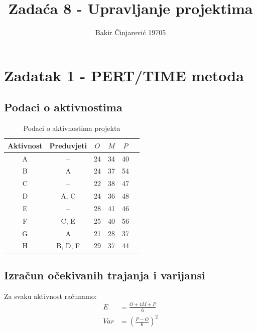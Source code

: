 \documentclass[12pt,a4paper]{article}
\title{Zadaća 8 - Upravljanje projektima}
\author{Bakir Činjarević 19705}
\date{}
\begin{document}
\maketitle

\section{Zadatak 1 - PERT/TIME metoda}

\subsection{Podaci o aktivnostima}

\begin{table}[h]
\centering
\begin{tabular}{cccccc}
\toprule
Aktivnost & Preduvjeti & $O$ & $M$ & $P$ \\
\midrule
A & -- & 24 & 34 & 40 \\
B & A & 24 & 37 & 54 \\
C & -- & 22 & 38 & 47 \\
D & A, C & 24 & 36 & 48 \\
E & -- & 28 & 41 & 46 \\
F & C, E & 25 & 40 & 56 \\
G & A & 21 & 28 & 37 \\
H & B, D, F & 29 & 37 & 44 \\
\bottomrule
\end{tabular}
\caption{Podaci o aktivnostima projekta}
\end{table}

\subsection{Izračun očekivanih trajanja i varijansi}

Za svaku aktivnost računamo:
\begin{align}
E &= \frac{O + 4M + P}{6} \\
Var &= \left(\frac{P - O}{6}\right)^2
\end{align}
\end{document}
